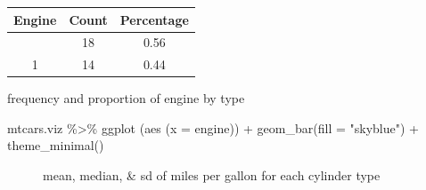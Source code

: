 \documentclass[
  man,
  floatsintext,
  longtable,
  nolmodern,
  notxfonts,
  notimes,
  colorlinks=true,linkcolor=blue,citecolor=blue,urlcolor=blue]{apa7}
\newenvironment{Shaded}{\begin{snugshade}}{\end{snugshade}}
\newcommand{\AttributeTok}[1]{\textcolor[rgb]{0.40,0.45,0.13}{#1}}
\newcommand{\FunctionTok}[1]{\textcolor[rgb]{0.28,0.35,0.67}{#1}}
\newcommand{\NormalTok}[1]{\textcolor[rgb]{0.00,0.23,0.31}{#1}}
\newcommand{\SpecialCharTok}[1]{\textcolor[rgb]{0.37,0.37,0.37}{#1}}
\newcommand{\StringTok}[1]{\textcolor[rgb]{0.13,0.47,0.30}{#1}}
\begin{document}
\begin{table}

{\caption{{Summary Statistics for
Engine}{\label{tbl-frequency-and-proportion-of-engine-being-v-shape-or-straight}}}
\vspace{-20pt}}

\begin{longtable}[]{@{}ccc@{}}
\toprule\noalign{}
Engine & Count & Percentage \\
\midrule\noalign{}
\endhead
\bottomrule\noalign{}
\endlastfoot
0 & 18 & 0.56 \\
1 & 14 & 0.44 \\
\end{longtable}

frequency and proportion of engine by type

\end{table}

\begin{Shaded}
\begin{Highlighting}[]
\NormalTok{mtcars.viz }\SpecialCharTok{\%\textgreater{}\%} \FunctionTok{ggplot}\NormalTok{ (}\FunctionTok{aes}\NormalTok{ (}\AttributeTok{x =}\NormalTok{ engine)) }\SpecialCharTok{+}
  \FunctionTok{geom\_bar}\NormalTok{(}\AttributeTok{fill =} \StringTok{"skyblue"}\NormalTok{) }\SpecialCharTok{+}
  \FunctionTok{theme\_minimal}\NormalTok{()}
\end{Highlighting}
\end{Shaded}

\begin{figure}[H]

\caption{\label{fig-frequency-and-proportion-of-engine-being-v-shape-or-straight}mean,
median, \& sd of miles per gallon for each cylinder type}


\end{figure}%
\end{document}
